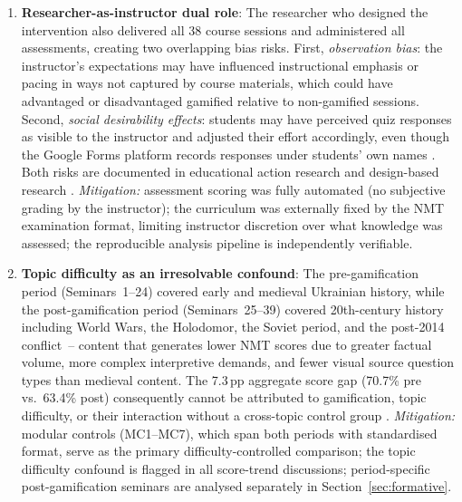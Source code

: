 \begin{enumerate}
\item \textbf{Researcher-as-instructor dual role}: The researcher who designed the intervention also delivered all 38 course sessions and administered all assessments, creating two overlapping bias risks. First, \textit{observation bias}: the instructor's expectations may have influenced instructional emphasis or pacing in ways not captured by course materials, which could have advantaged or disadvantaged gamified relative to non-gamified sessions. Second, \textit{social desirability effects}: students may have perceived quiz responses as visible to the instructor and adjusted their effort accordingly, even though the Google Forms platform records responses under students' own names \cite{creswell}. Both risks are documented in educational action research and design-based research \cite{Reeves2003}. \textit{Mitigation:} assessment scoring was fully automated (no subjective grading by the instructor); the curriculum was externally fixed by the NMT examination format, limiting instructor discretion over what knowledge was assessed; the reproducible analysis pipeline is independently verifiable.

\item \textbf{Topic difficulty as an irresolvable confound}: The pre-gamification period (Seminars~1--24) covered early and medieval Ukrainian history, while the post-gamification period (Seminars~25--39) covered 20th-century history including World Wars, the Holodomor, the Soviet period, and the post-2014 conflict~-- content that generates lower NMT scores due to greater factual volume, more complex interpretive demands, and fewer visual source question types than medieval content. The 7.3\,pp aggregate score gap (70.7\% pre vs.\ 63.4\% post) consequently cannot be attributed to gamification, topic difficulty, or their interaction without a cross-topic control group \cite{DichevDicheva2017, Korniienko2025mrqs}. \textit{Mitigation:} modular controls (MC1--MC7), which span both periods with standardised format, serve as the primary difficulty-controlled comparison; the topic difficulty confound is flagged in all score-trend discussions; period-specific post-gamification seminars are analysed separately in Section~\ref{sec:formative}.


\end{enumerate}
